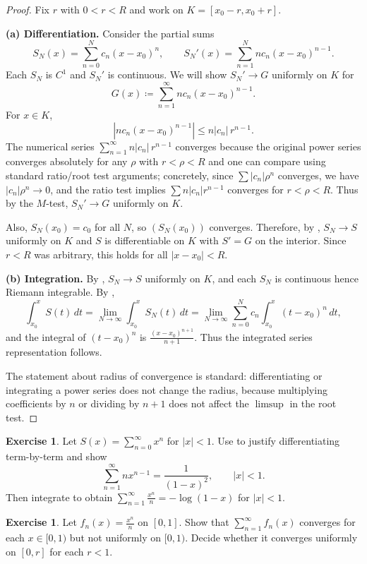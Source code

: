 \documentclass[12pt]{article}
\numberwithin{equation}{section}
\def\abs#1{|#1|}
\def\diff{d}
\DeclarePairedDelimiter{\abs}{\lvert}{\rvert}
\newcommand{\diff}{\mathop{}\!\mathrm{d}}    %
\theoremstyle{plain}
\theoremstyle{definition}
\newtheorem{exercise}[theorem]{Exercise}
\theoremstyle{remark}
\begin{document}
\begin{proof}
Fix $r$ with $0<r<R$ and work on $K=[x_0-r,x_0+r]$.

\textbf{(a) Differentiation.}
Consider the partial sums
\[
S_N(x)=\sum_{n=0}^{N} c_n(x-x_0)^n,
\qquad
S_N'(x)=\sum_{n=1}^{N} n c_n(x-x_0)^{n-1}.
\]
Each $S_N$ is $C^1$ and $S_N'$ is continuous.
We will show $S_N'\to G$ uniformly on $K$ for
\[
G(x)\coloneqq \sum_{n=1}^\infty n c_n(x-x_0)^{n-1}.
\]
For $x\in K$,
\[
\abs{n c_n(x-x_0)^{n-1}}\le n\abs{c_n}\,r^{n-1}.
\]
The numerical series $\sum_{n=1}^\infty n\abs{c_n}\,r^{n-1}$ converges because the original power series converges absolutely for any $\rho$ with $r<\rho<R$
and one can compare using standard ratio/root test arguments; concretely, since $\sum \abs{c_n}\rho^n$ converges,
we have $\abs{c_n}\rho^n\to 0$, and the ratio test implies $\sum n\abs{c_n}r^{n-1}$ converges for $r<\rho<R$.
Thus by the $M$-test, $S_N'\to G$ uniformly on $K$.

Also, $S_N(x_0)=c_0$ for all $N$, so $(S_N(x_0))$ converges.
Therefore, by , $S_N\to S$ uniformly on $K$ and $S$ is differentiable on $K$ with $S'=G$ on the interior.
Since $r<R$ was arbitrary, this holds for all $\abs{x-x_0}<R$.

\textbf{(b) Integration.}
By , $S_N\to S$ uniformly on $K$, and each $S_N$ is continuous hence Riemann integrable.
By ,
\[
\int_{x_0}^{x} S(t)\,\diff t
=
\lim_{N\to\infty}\int_{x_0}^{x} S_N(t)\,\diff t
=
\lim_{N\to\infty}\sum_{n=0}^{N} c_n \int_{x_0}^{x}(t-x_0)^n\,\diff t,
\]
and the integral of $(t-x_0)^n$ is $\frac{(x-x_0)^{n+1}}{n+1}$.
Thus the integrated series representation follows.

The statement about radius of convergence is standard: differentiating or integrating a power series does not change the radius,
because multiplying coefficients by $n$ or dividing by $n+1$ does not affect the $\limsup$ in the root test.
\end{proof}

\begin{exercise}
Let $S(x)=\sum_{n=0}^\infty x^n$ for $\abs{x}<1$.
Use  to justify differentiating term-by-term and show
\[
\sum_{n=1}^\infty n x^{n-1}=\frac{1}{(1-x)^2},\qquad \abs{x}<1.
\]
Then integrate to obtain $\sum_{n=1}^\infty \frac{x^n}{n}=-\log(1-x)$ for $\abs{x}<1$.
\end{exercise}

\begin{exercise}
Let $f_n(x)=\frac{x^n}{n}$ on $[0,1]$. Show that $\sum_{n=1}^\infty f_n(x)$ converges for each $x\in[0,1)$ but not uniformly on $[0,1)$.
Decide whether it converges uniformly on $[0,r]$ for each $r<1$.
\end{exercise}
\end{document}
